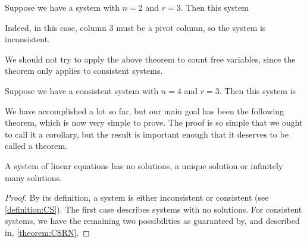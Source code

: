 \documentclass{ximera}
\begin{document}
\begin{example}
  Suppose we have a system with $n=2$ and $r=3$.  Then this system
  \begin{multipleChoice}
  \end{multipleChoice}
  \begin{feedback}
    Indeed, in this case, column 3 must be a pivot column, so the
    system is inconsistent.

    We should not try to apply the above theorem to count free
    variables, since the theorem only applies to consistent
    systems.
  \end{feedback}
\end{example}

\begin{example}
  Suppose we have a consistent system with $n=4$ and $r=3$.  Then this system is
  \begin{multipleChoice}
  \end{multipleChoice}
\end{example}

We have accomplished a lot so far, but our main goal has been the
following theorem, which is now very simple to prove.  The proof is so
simple that we ought to call it a corollary, but the result is
important enough that it deserves to be called a theorem.

\begin{theorem}
\label{theorem:PSSLS}

A system of linear equations has no solutions, a unique solution or infinitely many solutions.

\begin{proof}
By its definition, a system is either inconsistent or consistent (see \ref{definition:CS}).  The first case describes systems with no solutions.  For consistent systems, we have the remaining two possibilities as guaranteed by, and described in, \ref{theorem:CSRN}.
\end{proof}
\end{theorem}
\end{document}

